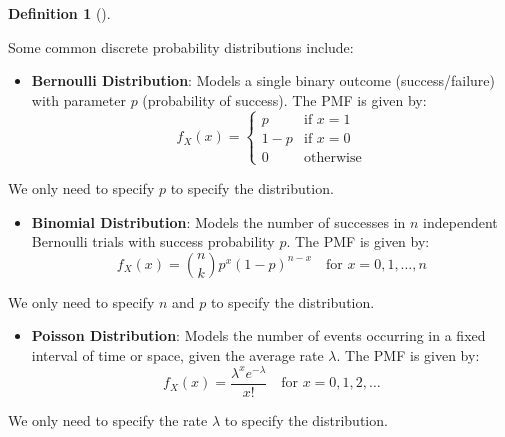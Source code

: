 \documentclass[
  letterpaper,
  DIV=11,
  numbers=noendperiod]{scrreport}
\providecommand{\tightlist}{%
  \setlength{\itemsep}{0pt}\setlength{\parskip}{0pt}}
\theoremstyle{definition}
\theoremstyle{plain}
\theoremstyle{definition}
\newtheorem{definition}{Definition}[chapter]
\theoremstyle{plain}
\theoremstyle{remark}
\begin{document}
\begin{tcolorbox}[enhanced jigsaw, breakable, opacityback=0, leftrule=.75mm, colback=white, bottomtitle=1mm, coltitle=black, toptitle=1mm, titlerule=0mm, bottomrule=.15mm, colframe=quarto-callout-note-color-frame, title={Common Probability Distributions}, opacitybacktitle=0.6, colbacktitle=quarto-callout-note-color!10!white, rightrule=.15mm, arc=.35mm, toprule=.15mm, left=2mm]

\begin{definition}[]\protect\hypertarget{def-probability-distributions}{}\label{def-probability-distributions}

Some common discrete probability distributions include:

\begin{itemize}
\tightlist
\item
  \textbf{Bernoulli Distribution}: Models a single binary outcome
  (success/failure) with parameter \(p\) (probability of success). The
  PMF is given by: \[
  f_X(x) =
  \begin{cases}
  p & \text{if } x = 1 \\
  1 - p & \text{if } x = 0 \\
  0 & \text{otherwise}
  \end{cases}
  \]
\end{itemize}

We only need to specify \(p\) to specify the distribution.

\begin{itemize}
\tightlist
\item
  \textbf{Binomial Distribution}: Models the number of successes in
  \(n\) independent Bernoulli trials with success probability \(p\). The
  PMF is given by: \[
  f_X(x) = \binom{n}{k} p^x (1 - p)^{n-x} \quad \text{for } x = 0, 1, \ldots, n
  \]
\end{itemize}

We only need to specify \(n\) and \(p\) to specify the distribution.

\begin{itemize}
\tightlist
\item
  \textbf{Poisson Distribution}: Models the number of events occurring
  in a fixed interval of time or space, given the average rate
  \(\lambda\). The PMF is given by: \[
  f_X(x) = \frac{\lambda^x e^{-\lambda}}{x!} \quad \text{for }x = 0, 1, 2, \ldots
  \]
\end{itemize}

We only need to specify the rate \(\lambda\) to specify the
distribution.


\end{definition}
\end{tcolorbox}
\end{document}
